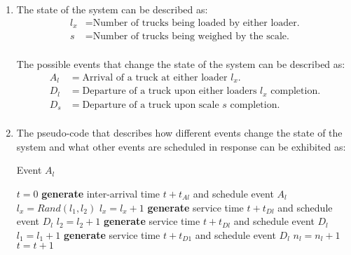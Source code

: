 \documentclass{article}
\begin{document}
\begin{enumerate}
    \begin{enumerate}
        \item The state of the system can be described as:
        \begin{equation}
            \begin{split}
                l_x &= \text{Number of trucks being loaded by either loader.}\\
                s &= \text{Number of trucks being weighed by the scale.}\\
            \end{split}
        \end{equation}

        The possible events that change the state of the system can be described as:
        \begin{equation}
            \begin{split}
                A_l &= \text{Arrival of a truck at either loader $l_x$.}\\
                D_l &= \text{Departure of a truck upon either loaders $l_x$ completion.}\\
                D_s &= \text{Departure of a truck upon scale $s$ completion.}\\
            \end{split}
        \end{equation}
    
        \item The pseudo-code that describes how different events change the state of the system and what other events are scheduled in response can be exhibited as:
        
\begin{algorithm}[H]
\caption{Event $A_l$}
\begin{algorithmic}[1]
\STATE $t = 0$
    \STATE \textbf{generate} inter-arrival time $t+t_{Al}$ and schedule event $A_l$
        \STATE $l_x = Rand(l_1, l_2)$
        \STATE $l_x = l_x + 1$
        \STATE \textbf{generate} service time $t+t_{Dl}$ and schedule event $D_l$
    \ENDIF
        \STATE $l_2 = l_2 + 1$
        \STATE \textbf{generate} service time $t+t_{Dl}$ and schedule event $D_l$
    \ENDIF
        \STATE $l_1 = l_1 + 1$
        \STATE \textbf{generate} service time $t+t_{D1}$ and schedule event $D_l$
    \ENDIF
        \STATE $n_l = n_l + 1$
    \ENDIF
    \STATE $t=t+1$
\ENDWHILE
\end{algorithmic}
\end{algorithm}


\end{enumerate}
\end{enumerate}
\end{document}
